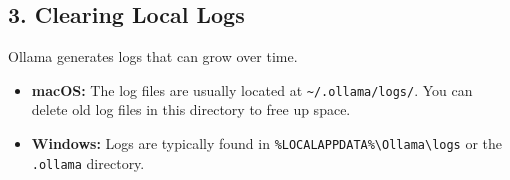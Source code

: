 \documentclass{article}
\begin{document}
\subsection*{3. Clearing Local Logs}
Ollama generates logs that can grow over time.
\begin{itemize}
    \item \textbf{macOS:} The log files are usually located at \texttt{\textasciitilde/.ollama/logs/}. You can delete old log files in this directory to free up space.
    \item \textbf{Windows:} Logs are typically found in \texttt{\%LOCALAPPDATA\%\textbackslash Ollama\textbackslash logs} or the \texttt{.ollama} directory.
\end{itemize}
\end{document}
